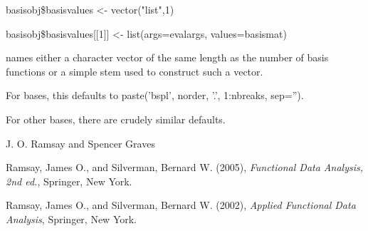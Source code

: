 \documentclass{article}
\begin{document}
\begin{Details}
{{basisobj\$basisvalues <- vector("list",1)

basisobj\$basisvalues[[1]] <- list(args=evalargs,
values=basismat)

\item[names] either a character vector of the same length as the number of
basis functions or a simple stem used to construct such a
vector.

For  bases, this defaults to paste('bspl', norder,
'.', 1:nbreaks, sep='').

For other bases, there are crudely similar defaults.

}
}
\end{Details}
\begin{Author}\relax
J. O. Ramsay and Spencer Graves
\end{Author}
\begin{References}\relax
Ramsay, James O., and Silverman, Bernard W. (2005), \emph{Functional
Data Analysis, 2nd ed.}, Springer, New York.

Ramsay, James O., and Silverman, Bernard W. (2002), \emph{Applied
Functional Data Analysis}, Springer, New York.
\end{References}
\begin{SeeAlso}\relax
{}
\end{SeeAlso}
\end{document}
